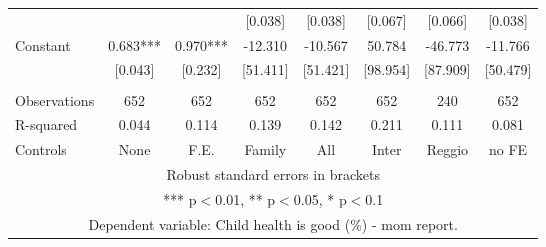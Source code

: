 \begin{tabular}{lccccccc}
 &  &  & [0.038] & [0.038] & [0.067] & [0.066] & [0.038] \\
Constant & 0.683*** & 0.970*** & -12.310 & -10.567 & 50.784 & -46.773 & -11.766 \\
 & [0.043] & [0.232] & [51.411] & [51.421] & [98.954] & [87.909] & [50.479] \\
 &  &  &  &  &  &  &  \\
Observations & 652 & 652 & 652 & 652 & 652 & 240 & 652 \\
R-squared & 0.044 & 0.114 & 0.139 & 0.142 & 0.211 & 0.111 & 0.081 \\
 Controls & None & F.E. & Family & All & Inter & Reggio & no FE \\ \hline
\multicolumn{8}{c}{ Robust standard errors in brackets} \\
\multicolumn{8}{c}{ *** p$<$0.01, ** p$<$0.05, * p$<$0.1} \\
\multicolumn{8}{c}{ Dependent variable: Child health is good (\%) - mom report.} \\
\end{tabular}
